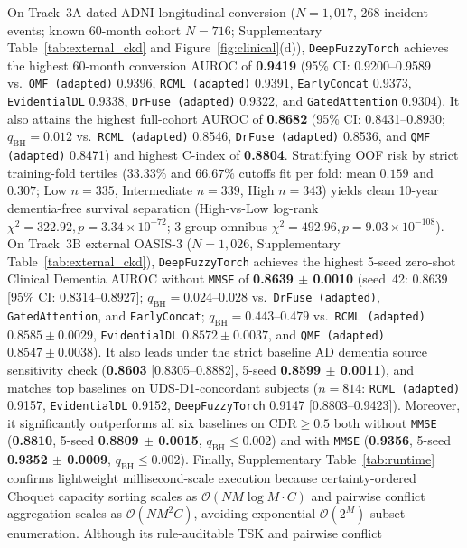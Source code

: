 \documentclass[10pt,twocolumn]{article}
\begin{document}
On Track~3A dated ADNI longitudinal conversion ($N=1,017$, 268 incident events; known 60-month
cohort $N=716$; Supplementary Table~\ref{tab:external_ckd} and Figure~\ref{fig:clinical}(d)),
\texttt{DeepFuzzyTorch} achieves the highest 60-month conversion AUROC of \textbf{0.9419} (95\%
CI: 0.9200--0.9589 vs.\ \texttt{QMF (adapted)} 0.9396, \texttt{RCML (adapted)} 0.9391,
\texttt{EarlyConcat} 0.9373, \texttt{EvidentialDL} 0.9338, \texttt{DrFuse (adapted)} 0.9322,
and \texttt{GatedAttention} 0.9304). It also attains the highest full-cohort AUROC of
\textbf{0.8682} (95\%
CI: 0.8431--0.8930; $q_{\text{BH}}=0.012$ vs.\ \texttt{RCML (adapted)} 0.8546,
\texttt{DrFuse (adapted)} 0.8536, and \texttt{QMF (adapted)} 0.8471) and highest C-index of
\textbf{0.8804}. Stratifying OOF risk by strict training-fold tertiles ($33.33\%$ and $66.67\%$
cutoffs fit per fold: mean $0.159$ and $0.307$; Low $n=335$, Intermediate $n=339$, High
$n=343$) yields clean 10-year dementia-free survival separation (High-vs-Low log-rank $\chi^2 =
322.92, p = 3.34 \times 10^{-72}$; 3-group omnibus $\chi^2 = 492.96, p = 9.03 \times
10^{-108}$). On Track~3B external OASIS-3 ($N=1,026$, Supplementary
Table~\ref{tab:external_ckd}),
\texttt{DeepFuzzyTorch} achieves the highest 5-seed zero-shot Clinical Dementia AUROC without
\texttt{MMSE} of \textbf{0.8639 $\pm$ 0.0010} (seed~42: 0.8639 [95\%
CI: 0.8314--0.8927]; $q_{\text{BH}}=0.024\text{--}0.028$ vs.\ \texttt{DrFuse (adapted)},
\texttt{GatedAttention}, and \texttt{EarlyConcat}; $q_{\text{BH}}=0.443\text{--}0.479$ vs.\
\texttt{RCML (adapted)} $0.8585 \pm 0.0029$, \texttt{EvidentialDL} $0.8572 \pm 0.0037$, and
\texttt{QMF (adapted)} $0.8547 \pm 0.0038$). It also leads under the strict baseline AD
dementia source
sensitivity check (\textbf{0.8603} [0.8305--0.8882], 5-seed \textbf{0.8599 $\pm$ 0.0011}), and
matches top baselines on UDS-D1-concordant subjects ($n=814$: \texttt{RCML (adapted)} 0.9157,
\texttt{EvidentialDL} 0.9152, \texttt{DeepFuzzyTorch} 0.9147 [0.8803--0.9423]). Moreover, it
significantly outperforms all six baselines on $\text{CDR}\ge 0.5$ both without \texttt{MMSE}
(\textbf{0.8810}, 5-seed \textbf{0.8809 $\pm$ 0.0015}, $q_{\text{BH}} \le 0.002$) and with
\texttt{MMSE} (\textbf{0.9356}, 5-seed \textbf{0.9352 $\pm$ 0.0009}, $q_{\text{BH}} \le
0.002$). Finally, Supplementary Table~\ref{tab:runtime} confirms lightweight millisecond-scale
execution
because certainty-ordered Choquet capacity sorting scales as $\mathcal{O}(NM\log M\cdot C)$ and
pairwise conflict aggregation scales as $\mathcal{O}(NM^2 C)$, avoiding exponential
$\mathcal{O}(2^M)$ subset enumeration. Although its rule-auditable TSK and pairwise conflict
\end{document}
